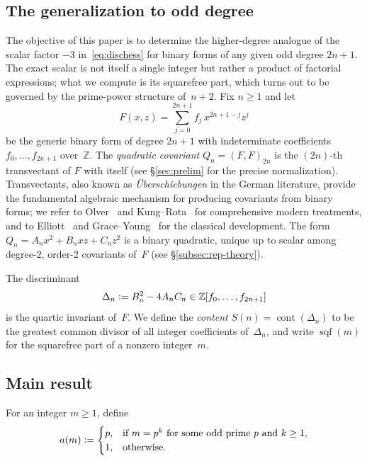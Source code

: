 \documentclass[10pt]{amsart}
\theoremstyle{definition}
\theoremstyle{remark}
\DeclareMathOperator{\cont}{cont}
\DeclareMathOperator{\sqf}{sqf}
\newcommand{\BZ}{\mathbb{Z}}
\newcommand{\defeq}{\vcentcolon=}
\begin{document}
\subsection{The generalization to odd degree}

The objective of this paper is to determine the higher-degree
analogue of the scalar factor $-3$ in~\eqref{eq:dischess} for binary
forms of any given odd degree $2n+1$.  The exact scalar is not itself a
single integer but rather a product of factorial expressions; what we
compute is its squarefree part, which turns out to be governed by the
prime-power structure of~$n+2$.  Fix $n \ge 1$ and let
\begin{equation}\label{eq:genericF}
F(x,z) = \sum_{j=0}^{2n+1} f_j \, x^{2n+1-j} z^j
\end{equation}
be the generic binary form of degree $2n+1$ with indeterminate coefficients
$f_0,\dots,f_{2n+1}$ over~$\BZ$.  The \emph{quadratic covariant}
$Q_n = (F,F)_{2n}$ is the $(2n)$-th transvectant of $F$ with itself (see
\S\ref{sec:prelim} for the precise normalization).  Transvectants, also
known as \emph{\"Uberschiebungen} in the German literature, provide the
fundamental algebraic mechanism for producing covariants from binary forms;
we refer to Olver~\cite[Chapter~5]{Olver1999} and
Kung--Rota~\cite{KungRota1984} for comprehensive modern treatments,
and to Elliott~\cite{Elliott1895} and Grace--Young~\cite{GraceYoung1903}
for the classical development.  The form
$Q_n = A_n x^2 + B_n xz + C_n z^2$ is a binary quadratic, unique up to
scalar among degree-$2$, order-$2$ covariants of~$F$
(see \S\ref{subsec:rep-theory}).

The discriminant
\begin{equation}\label{eq:Delta-def}
\Delta_n \defeq B_n^2 - 4A_nC_n \in \BZ[f_0,\dots,f_{2n+1}]
\end{equation}
is the quartic invariant of~$F$.  We define the \emph{content}
$S(n) = \cont(\Delta_n)$ to be the greatest common divisor of all integer
coefficients of~$\Delta_n$, and write $\sqf(m)$ for the squarefree part of a
nonzero integer~$m$.


\subsection{Main result}

For an integer $m \ge 1$, define
\begin{equation}\label{eq:a-def}
a(m) \defeq \begin{cases}
p, & \text{if } m = p^k \text{ for some odd prime } p \text{ and } k \ge 1,\\
1, & \text{otherwise.}
\end{cases}
\end{equation}
\end{document}
